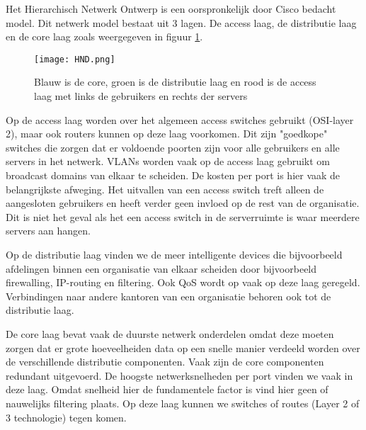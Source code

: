 Het Hierarchisch Netwerk Ontwerp is een oorspronkelijk door Cisco bedacht model. Dit netwerk model bestaat uit 3 lagen. De access laag, de distributie laag en de core laag zoals weergegeven in figuur \ref{HND}.

\begin{figure}[H]
\centering
\texttt{[image: HND.png]}
\caption{Blauw is de core, groen is de distributie laag en rood is de access laag met links de gebruikers en rechts der servers}
\label{HND}
\end{figure}

Op de access laag worden over het algemeen access switches gebruikt (OSI-layer 2), maar ook routers kunnen op deze laag voorkomen. Dit zijn "goedkope" switches die zorgen dat er voldoende poorten zijn voor alle gebruikers en alle servers in het netwerk. VLANs worden vaak op de access laag gebruikt om broadcast domains van elkaar te scheiden. De kosten per port is hier vaak de belangrijkste afweging. Het uitvallen van een access switch treft alleen de aangesloten gebruikers en heeft verder geen invloed op de rest van de organisatie. Dit is niet het geval als het een access switch in de serverruimte is waar meerdere servers aan hangen.

Op de distributie laag vinden we de meer intelligente devices die bijvoorbeeld afdelingen binnen een organisatie van elkaar scheiden door bijvoorbeeld firewalling, IP-routing en filtering. Ook QoS wordt op vaak op deze laag geregeld. Verbindingen naar andere kantoren van een organisatie behoren ook tot de distributie laag. 

De core laag bevat vaak de duurste netwerk onderdelen omdat deze moeten zorgen dat er grote hoeveelheiden data op een snelle manier verdeeld worden over de verschillende distributie componenten. Vaak zijn de core componenten redundant uitgevoerd. De hoogste netwerksnelheden per port vinden we vaak in deze laag. Omdat snelheid hier de fundamentele factor is vind hier geen of nauwelijks filtering plaats. Op deze laag kunnen we switches of routes (Layer 2 of 3 technologie) tegen komen.

